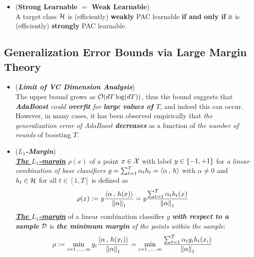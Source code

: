 \documentclass[11pt]{article}
\begin{document}
\begin{itemize}
\item \begin{theorem} (\textbf{Strong Learnable $=$ Weak Learnable})  \citep{schapire2012boosting}\\
A target class ${\mathcal H}$ is (efficiently) \textbf{weakly} PAC learnable \textbf{if and only if} it is (efficiently) \textbf{strongly} PAC learnable.
\end{theorem}
\end{itemize}

\subsection{Generalization Error Bounds via Large Margin Theory}
\begin{itemize}
\item \begin{remark}(\emph{\textbf{Limit of VC Dimension Analysis}})\\
The upper bound grows as ${\mathcal O}(dT \log(dT))$, thus the bound suggests that \emph{\textbf{AdaBoost} could \textbf{overfit} for \textbf{large values of $T$}}, and indeed this can occur. However, in many cases, it has been observed empirically that \emph{the generalization error of AdaBoost \textbf{decreases}} as a function of \emph{the number of rounds} of boosting $T$.
\end{remark}

\item \begin{definition} (\textbf{\emph{$L_1$-Margin}}) \citep{mohri2018foundations, schapire2012boosting}\\
\underline{\emph{\textbf{The $L_1$-margin}}} $\rho(x)$ of a point $x \in {\mathcal X}$ with label $y \in \left\{-1, +1\right\}$ for \emph{a linear combination of base classifiers} $g = \sum_{t=1}^{T}\alpha_t h_t = \left\langle \alpha\,,\, h \right\rangle$ with $\alpha \neq 0$ and $h_t \in {\mathcal H}$ for all $t \in [1, T]$ is defined as
\begin{align}
\rho(x) := y \frac{\left\langle \alpha\,,\, h(x) \right\rangle}{\left\|\alpha\right\|_{1}} = y \frac{\sum_{t=1}^{T}\alpha_t h_t(x)}{\left\|\alpha\right\|_{1}} \label{def: l1_margin}
\end{align} \underline{\emph{\textbf{The $L_1$-margin}}} of a linear combination classifier $g$ \emph{\textbf{with respect to a sample}} ${\mathcal D}$ is \emph{\textbf{the minimum margin} of the points within the sample}:
\begin{align}
\rho := \min_{i=1\,{,}\ldots{,}\, m}y_i \frac{\left\langle \alpha\,,\, h(x_i) \right\rangle}{\left\|\alpha\right\|_{1}} = \min_{i=1\,{,}\ldots{,}\, m} \frac{\sum_{t=1}^{T}\alpha_t y_i  h_t(x_i)}{\left\|\alpha\right\|_{1}} \label{def: l1_margin_sample}
\end{align}
\end{definition}


\end{itemize}
\end{document}
